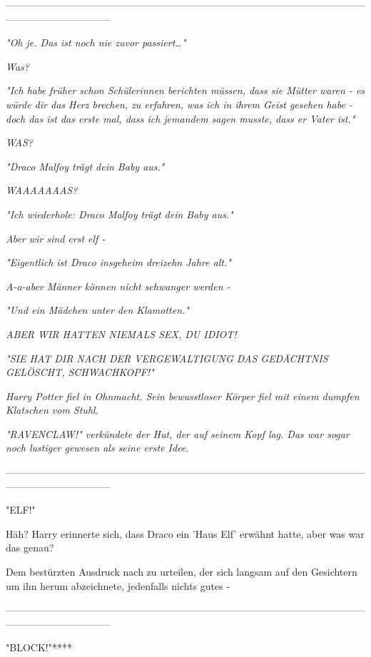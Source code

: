 {--------------------------------------------------------------------------------------------------------------------------------------------

\emph{"\emph{Oh je. Das ist noch nie zuvor passiert…}"}

\emph{\emph{Was?}}

\emph{"\emph{Ich habe früher schon Schülerinnen berichten müssen, dass sie Mütter waren - es würde dir das Herz brechen, zu erfahren, was ich in ihrem Geist gesehen habe - doch das ist das erste mal, dass ich jemandem sagen musste, dass er Vater ist.}"}

\emph{\emph{WAS?}}

\emph{"\emph{Draco Malfoy trägt dein Baby aus.}"}

\emph{\emph{WAAAAAAAS?}}

\emph{"\emph{Ich wiederhole: Draco Malfoy trägt dein Baby aus.}"}

\emph{\emph{Aber wir sind erst elf -}}

\emph{"\emph{Eigentlich ist Draco insgeheim dreizehn Jahre alt.}"}

\emph{\emph{A-a-aber Männer können nicht schwanger werden -}}

\emph{"\emph{Und ein Mädchen unter den Klamotten.}"}

\emph{\emph{ABER WIR HATTEN NIEMALS SEX, DU IDIOT!}}

\emph{"\emph{SIE HAT DIR NACH DER VERGEWALTIGUNG DAS GEDÄCHTNIS GELÖSCHT, SCHWACHKOPF!}"}

\emph{Harry Potter fiel in Ohnmacht. Sein bewusstloser Körper fiel mit einem dumpfen Klatschen vom Stuhl.}

\emph{"RAVENCLAW!" verkündete der Hut, der auf seinem Kopf lag. Das war sogar noch lustiger gewesen als seine erste Idee.}

--------------------------------------------------------------------------------------------------------------------------------------------

"ELF!"

Häh? Harry erinnerte sich, dass Draco ein 'Haus Elf' erwähnt hatte, aber was war das genau?

Dem bestürzten Ausdruck nach zu urteilen, der sich langsam auf den Gesichtern um ihn herum abzeichnete, jedenfalls nichts gutes -

--------------------------------------------------------------------------------------------------------------------------------------------

"BLOCK!"****

}
